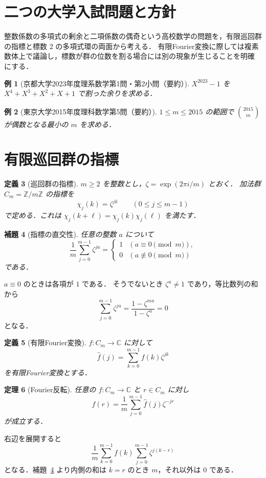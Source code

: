 \documentclass[a5paper,10pt,onecolumn]{jsarticle}
\makeatletter
\theoremstyle{mathnotetheorem}
\newtheorem{theorem}{定理}[section]
\newtheorem{definition}[theorem]{定義}
\newtheorem{lemma}[theorem]{補題}
\newtheorem{example}[theorem]{例}
\renewcommand{\proofname}{証明}
\renewenvironment{proof}[1][\proofname]{%
  \par\pushQED{\qed}\normalfont\topsep4\p@\@plus2\p@\relax
  \trivlist\item[\hskip\labelsep\bfseries #1]\ignorespaces
}{\popQED\endtrivlist\@endpefalse}
\makeatother
\begin{document}
\section{二つの大学入試問題と方針}
整数係数の多項式の剰余と二項係数の偶奇という高校数学の問題を，有限巡回群の指標と標数 $2$ の多項式環の両面から考える．
有限Fourier変換に際しては複素数体上で議論し，標数が群の位数を割る場合には別の現象が生じることを明確にする．

\begin{example}[京都大学2023年度理系数学第1問・第2小問（要約）]\label{ex:kyoto}
$X^{2023}-1$ を $X^4+X^3+X^2+X+1$ で割った余りを求める．
\end{example}
\begin{example}[東京大学2015年度理科数学第5問（要約）]\label{ex:tokyo}
$1\le m\le2015$ の範囲で $\binom{2015}{m}$ が偶数となる最小の $m$ を求める．
\end{example}

\section{有限巡回群の指標}
\begin{definition}[巡回群の指標]
$m\ge2$ を整数とし，$\zeta=\exp(2\pi i/m)$ とおく．
加法群 $C_m=\mathbb Z/m\mathbb Z$ の指標を
\[
 \chi_j(k)=\zeta^{jk}\qquad(0\le j\le m-1)
\]
で定める．これは $\chi_j(k+\ell)=\chi_j(k)\chi_j(\ell)$ を満たす．
\end{definition}
\begin{lemma}[指標の直交性]\label{lem:orth}
任意の整数 $a$ について
\[
 \frac1m\sum_{j=0}^{m-1}\zeta^{ja}=
 \begin{cases}1&(a\equiv0\pmod m),\\0&(a\not\equiv0\pmod m)\end{cases}
\]
である．
\end{lemma}
\begin{proof}
$a\equiv0$ のときは各項が $1$ である．
そうでないとき $\zeta^a\ne1$ であり，等比数列の和から
\[
 \sum_{j=0}^{m-1}\zeta^{ja}=
 \frac{1-\zeta^{ma}}{1-\zeta^a}=0
\]
となる．
\end{proof}

\begin{definition}[有限Fourier変換]
$f:C_m\to\mathbb C$ に対して
\[
 \widehat f(j)=\sum_{k=0}^{m-1}f(k)\zeta^{jk}
\]
を有限Fourier変換とする．
\end{definition}
\begin{theorem}[Fourier反転]\label{thm:inversion}
任意の $f:C_m\to\mathbb C$ と $r\in C_m$ に対し
\[
 f(r)=\frac1m\sum_{j=0}^{m-1}\widehat f(j)\zeta^{-jr}
\]
が成立する．
\end{theorem}
\begin{proof}
右辺を展開すると
\[
 \frac1m\sum_{k=0}^{m-1}f(k)
 \sum_{j=0}^{m-1}\zeta^{j(k-r)}
\]
となる．補題~\ref{lem:orth} より内側の和は $k=r$ のとき $m$，それ以外は $0$ である．
\end{proof}
\end{document}
